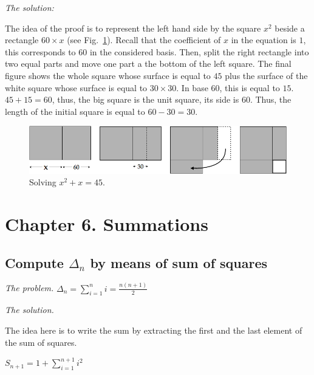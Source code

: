 \noindent \textit{The solution:}

The idea of the proof is to represent the left hand side by the square $x^2$ beside a rectangle $60 \times x$
(see Fig.~\ref{fig:equationBabillon}).
Recall that the coefficient of $x$ in the equation is $1$, this corresponds to $60$ in the considered basis. 
Then, split the right rectangle into two equal parts and move one part a the bottom of the left square.
The final figure shows the whole square whose surface is equal to $45$ plus the surface of the white square
whose surface is equal to $30 \times 30$.
In base $60$, this is equal to $15$. 
$45+15 = 60$, thus, the big square is the unit square, its side is $60$.
Thus, the length of the initial square is equal to $60-30=30$.
\begin{figure}[htb]
\begin{center}
       \includegraphics[scale=0.4]{FiguresArithmetic/tabletteMesopotamie}
\caption{Solving $x^2 + x = 45$.}
\label{fig:equationBabillon}
\end{center}
\end{figure}



\section{Chapter 6. Summations}


\subsection{Compute $\Delta_n$ by means of sum of squares}

\noindent \textit{The problem.}
$\Delta_n = \sum_{i=1}^{n} i = \frac{n(n+1)}{2}$
\medskip

\noindent \textit{The solution.}

The idea here is to write the sum by extracting the first and the last element
of the sum of squares.
\medskip

$S_{n+1} = 1 + \sum_{i=1}^{n+1} i^2$

